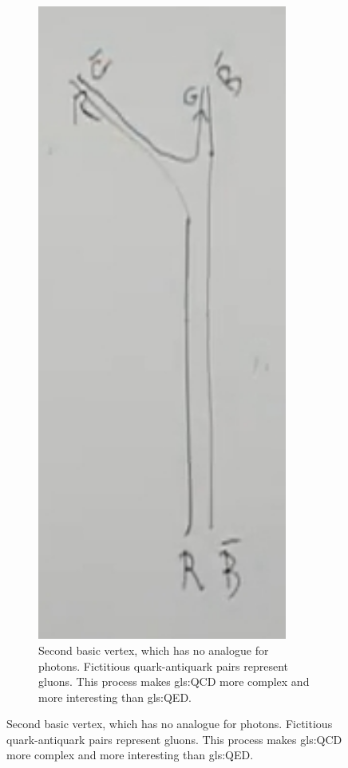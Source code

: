 \documentclass[]{article}
\begin{document}
\begin{figure}[H]
	\caption{Second basic vertex of \gls{gls:QCD}: gluons}\label{fig:2:basic:vertex}
		\begin{subfigure}[t]{0.40\textwidth}
		\caption{Second basic vertex, which has no analogue for photons. Fictitious quark-antiquark pairs represent gluons. This process makes \gls{gls:QCD} more complex and more interesting than \gls{gls:QED}.}\label{fig:2-2-gluon5}
		\includegraphics[width=0.9\textwidth]{2-2-gluon5}

\end{subfigure}
\end{figure}
\end{document}
